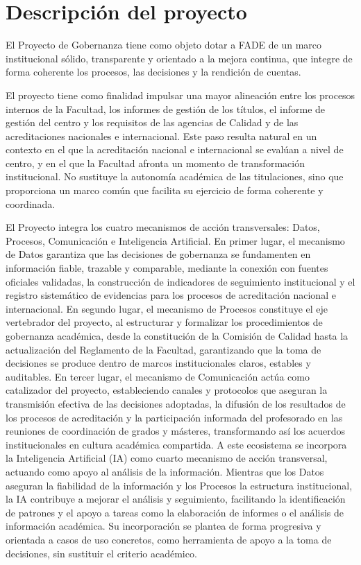 \documentclass[11pt,a4paper]{scrreprt}
\begin{document}
\section{Descripción del proyecto}

El Proyecto de Gobernanza tiene como objeto dotar a FADE de un marco institucional sólido, transparente y orientado a la mejora continua, que integre de forma coherente los procesos, las decisiones y la rendición de cuentas.   

El proyecto tiene como finalidad impulsar una mayor alineación entre los procesos internos de la Facultad, los informes de gestión de los títulos, el informe de gestión del centro y los requisitos de las agencias de Calidad y de las acreditaciones nacionales e internacional. Este paso resulta natural en un contexto en el que la acreditación nacional e internacional se evalúan a nivel de centro, y en el que la Facultad afronta un momento de transformación institucional. No sustituye la autonomía académica de las titulaciones, sino que proporciona un marco común que facilita su ejercicio de forma coherente y coordinada. 

El Proyecto integra los cuatro mecanismos de acción transversales: Datos, Procesos, Comunicación e Inteligencia Artificial. En primer lugar, el mecanismo de Datos garantiza que las decisiones de gobernanza se fundamenten en información fiable, trazable y comparable, mediante la conexión con fuentes oficiales validadas, la construcción de indicadores de seguimiento institucional y el registro sistemático de evidencias para los procesos de acreditación nacional e internacional. En segundo lugar, el mecanismo de Procesos constituye el eje vertebrador del proyecto, al estructurar y formalizar los procedimientos de gobernanza académica, desde la constitución de la Comisión de Calidad hasta la actualización del Reglamento de la Facultad, garantizando que la toma de decisiones se produce dentro de marcos institucionales claros, estables y auditables. En tercer lugar, el mecanismo de Comunicación actúa como catalizador del proyecto, estableciendo canales y protocolos que aseguran la transmisión efectiva de las decisiones adoptadas, la difusión de los resultados de los procesos de acreditación y la participación informada del profesorado en las reuniones de coordinación de grados y másteres, transformando así los acuerdos institucionales en cultura académica compartida. A este ecosistema se incorpora la Inteligencia Artificial (IA) como cuarto mecanismo de acción transversal, actuando como apoyo al análisis de la información. Mientras que los Datos aseguran la fiabilidad de la información y los Procesos la estructura institucional, la IA contribuye a mejorar el análisis y seguimiento, facilitando la identificación de patrones y el apoyo a tareas como la elaboración de informes o el análisis de información académica. Su incorporación se plantea de forma progresiva y orientada a casos de uso concretos, como herramienta de apoyo a la toma de decisiones, sin sustituir el criterio académico. 
\end{document}
